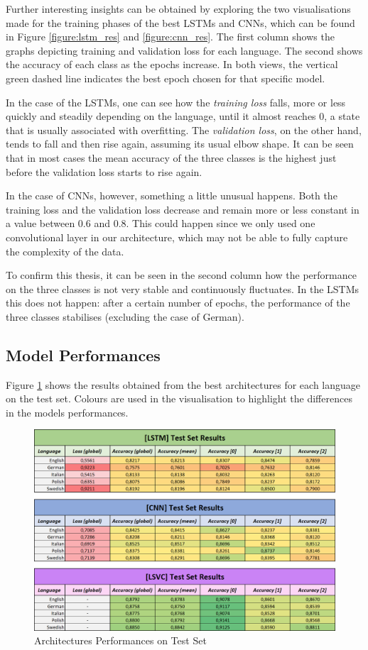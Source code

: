 \documentclass[letterpaper,11pt]{article}
\begin{document}
Further interesting insights can be obtained by exploring the two visualisations made for the training phases of the best LSTMs and CNNs, which can be found in Figure \ref{figure:lstm_res} and  \ref{figure:cnn_res}. The first column shows the graphs depicting training and validation loss for each language. The second shows the accuracy of each class as the epochs increase. In both views, the vertical green dashed line indicates the best epoch chosen for that specific model. 

In the case of the LSTMs, one can see how the \textit{training loss} falls, more or less quickly and steadily depending on the language, until it almost reaches 0, a state that is usually associated with overfitting. The \textit{validation loss}, on the other hand, tends to fall and then rise again, assuming its usual elbow shape. It can be seen that in most cases the mean accuracy of the three classes is the highest just before the validation loss starts to rise again.

In the case of CNNs, however, something a little unusual happens. Both the training loss and the validation loss decrease and remain more or less constant in a value between 0.6 and 0.8. This could happen since we only used one convolutional layer in our architecture, which may not be able to fully capture the complexity of the data.

To confirm this thesis, it can be seen in the second column how the performance on the three classes is not very stable and continuously fluctuates. In the LSTMs this does not happen: after a certain number of epochs, the performance of the three classes stabilises (excluding the case of German).  

\subsection{Model Performances}

Figure \ref{fig:results} shows the results obtained from the best architectures for each language on the test set. Colours are used in the visualisation to highlight the differences in the models performances.  

\begin{figure}[H]
  \centering
  \includegraphics[width=\textwidth]{results.png}
  \caption{Architectures Performances on Test Set}
  \label{fig:results}
\end{figure}
\end{document}
